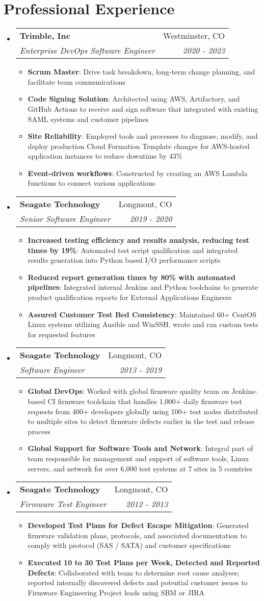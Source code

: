 \documentclass[letter,20pt]{article}
\makeatletter
\newcommand{\resumeItem}[2]{
  \item\small{
    \textbf{#1}{: #2 \vspace{-2pt}}
  }
}
\newcommand{\resumeSubheading}[4]{
  \vspace{-1pt}\item
    \begin{tabular*}{0.97\textwidth}{l@{\extracolsep{\fill}}r}
      \textbf{#1} & #2 \\
      \textit{#3} & \textit{#4} \\
    \end{tabular*}\vspace{-5pt}
}
\newcommand{\resumeSubHeadingListStart}{\begin{itemize}[leftmargin=*]}
\newcommand{\resumeSubHeadingListEnd}{\end{itemize}}
\newcommand{\resumeItemListStart}{\begin{itemize}}
\newcommand{\resumeItemListEnd}{\end{itemize}\vspace{-5pt}}
\makeatother
\begin{document}
\section{Professional Experience}
\resumeSubHeadingListStart
	\resumeSubheading
        {Trimble, Inc}{Westminster, CO}
	{Enterprise DevOps Software Engineer}{2020 - 2023}
	\resumeItemListStart
		\resumeItem{Scrum Master}{Drive task breakdown, long-term change planning, and facilitate team communications}
        \resumeItem{Code Signing Solution}{Architected using AWS, Artifactory, and GitHub Actions to receive and sign software that integrated with existing SAML systems and customer pipelines}
        \resumeItem{Site Reliability}{Employed tools and processes to diagnose, modify, and deploy production Cloud Formation Template changes for AWS-hosted application instances to reduce downtime by 43\%}
        \resumeItem{Event-driven workflows}{Constructed by creating an AWS Lambda functions to connect various applications}
	\resumeItemListEnd
\vspace{5pt}
    \resumeSubheading
        {Seagate Technology}{Longmont, CO}
	{Senior Software Engineer}{2019 - 2020}
	\resumeItemListStart
		\resumeItem{Increased testing efficiency and results analysis, reducing test times by 19\%}
		{Automated test script qualification and integrated results generation into Python based I/O performance scripts}
		\resumeItem{Reduced report generation times by 80\% with automated pipelines}
		{Integrated internal Jenkins and Python toolchains to generate product qualification reports for External Applications Engineers}
		\resumeItem{Assured Customer Test Bed Consistency}
		{Maintained 60+ CentOS Linux systems utilizing Ansible and WinSSH, wrote and ran custom tests for requested features}
	\resumeItemListEnd
\vspace{5pt}
	\resumeSubheading
	{Seagate Technology}{Longmont, CO}
	{Software Engineer}{2013 - 2019}
	\resumeItemListStart
		\resumeItem{Global DevOps}
		{Worked with global firmware quality team on Jenkins-based CI firmware toolchain that handles 1,000+ daily firmware test requests from 400+ developers globally using 100+ test nodes distributed to multiple sites to detect firmware defects earlier in the test and release process}
		\resumeItem{Global Support for Software Tools and Network}
		{Integral part of team responsible for management and support of software tools, Linux servers, and network for over 6,000 test systems at 7 sites in 5 countries}
	\resumeItemListEnd
\vspace{5pt}
	\resumeSubheading
	{Seagate Technology}{Longmont, CO}
	{Firmware Test Engineer}{2012 - 2013}
	\resumeItemListStart
		\resumeItem{Developed Test Plans for Defect Escape Mitigation}
		{Generated firmware validation plans, protocols, and associated documentation to comply with protocol (SAS / SATA) and customer specifications}
		\resumeItem{Executed 10 to 30 Test Plans per Week, Detected and Reported Defects}
		{Collaborated with team to determine root cause analyses; reported internally discovered defects and potential customer issues to Firmware Engineering Project leads using SBM or JIRA}
	\resumeItemListEnd
\resumeSubHeadingListEnd
\vspace{2pt}
\end{document}
